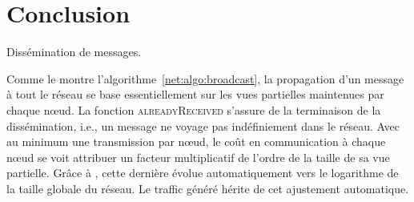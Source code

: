 
\section{Conclusion}
\label{net:sec:conclusionspray}

\begin{algorithm}[h]
  
  \caption{\label{net:algo:broadcast} Dissémination de messages.}
\end{algorithm}

Comme le montre l'algorithme~\ref{net:algo:broadcast}, la propagation d'un
message à tout le réseau se base essentiellement sur les vues partielles
maintenues par chaque nœud. La fonction \textsc{alreadyReceived} s'assure de la
terminaison de la dissémination, i.e., un message ne voyage pas indéfiniement
dans le réseau. Avec au minimum une transmission par nœud, le coût en
communication à chaque nœud se voit attribuer un facteur multiplicatif de
l'ordre de la taille de sa vue partielle. Grâce à \SPRAY, cette dernière évolue
automatiquement vers le logarithme de la taille globale du réseau. Le traffic
généré hérite de cet ajustement automatique.

